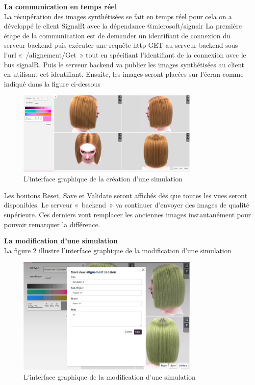 \textbf{La communication en temps réel}
\\
La récupération des images synthétisées se fait en temps réel pour cela on a développé le client SignalR avec la dépendance @microsoft/signalr
La première étape de la communication est de demander un identifiant de connexion du serveur backend puis exécuter une requête http GET au serveur backend sous l’url « /alignement/Get » tout en spécifiant l’identifiant de la connexion avec le bus signalR. Puis le serveur backend va publier les images synthétisées au client en utilisant cet identifiant. 
Ensuite, les images seront placées sur l’écran comme indiqué dans la figure ci-dessous 
\begin{figure}[!ht]\centering
\includegraphics[width=0.8\textwidth]{chapitres/chapitre5/figures/EditSimu.png}
\caption{L’interface graphique de la création d’une simulation}
\label{fig:git}
\end{figure}

Les boutons Reset, Save et Validate seront affichés dès que toutes les vues seront disponibles. Le serveur « backend » va continuer d’envoyer des images de qualité supérieure. Ces derniers vont remplacer les anciennes images instantanément pour pouvoir remarquer la différence.

\textbf{La modification d’une simulation}
\\ 
La figure \ref{fig:simuModif} illustre l’interface graphique de la modification d’une simulation
\begin{figure}[!ht]\centering
\includegraphics[width=0.8\textwidth]{chapitres/chapitre5/figures/NewAlignment.png}
\caption{L’interface graphique de la modification d’une simulation}
\label{fig:simuModif}
\end{figure}

